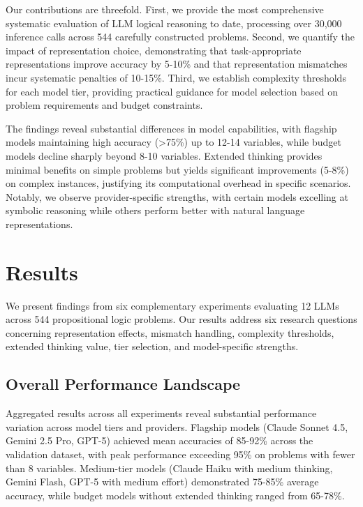 \documentclass[pdflatex,sn-mathphys-num]{sn-jnl}%
\theoremstyle{thmstyleone}%
\theoremstyle{thmstyletwo}%
\theoremstyle{thmstylethree}%
\begin{document}
Our contributions are threefold. First, we provide the most comprehensive systematic evaluation of LLM logical reasoning to date, processing over 30,000 inference calls across 544 carefully constructed problems. Second, we quantify the impact of representation choice, demonstrating that task-appropriate representations improve accuracy by 5-10\% and that representation mismatches incur systematic penalties of 10-15\%. Third, we establish complexity thresholds for each model tier, providing practical guidance for model selection based on problem requirements and budget constraints.

The findings reveal substantial differences in model capabilities, with flagship models maintaining high accuracy (>75\%) up to 12-14 variables, while budget models decline sharply beyond 8-10 variables. Extended thinking provides minimal benefits on simple problems but yields significant improvements (5-8\%) on complex instances, justifying its computational overhead in specific scenarios. Notably, we observe provider-specific strengths, with certain models excelling at symbolic reasoning while others perform better with natural language representations. 

\section{Results}\label{sec2}

We present findings from six complementary experiments evaluating 12 LLMs across 544 propositional logic problems. Our results address six research questions concerning representation effects, mismatch handling, complexity thresholds, extended thinking value, tier selection, and model-specific strengths.

\subsection{Overall Performance Landscape}\label{subsec:overall}

Aggregated results across all experiments reveal substantial performance variation across model tiers and providers. Flagship models (Claude Sonnet 4.5, Gemini 2.5 Pro, GPT-5) achieved mean accuracies of 85-92\% across the validation dataset, with peak performance exceeding 95\% on problems with fewer than 8 variables. Medium-tier models (Claude Haiku with medium thinking, Gemini Flash, GPT-5 with medium effort) demonstrated 75-85\% average accuracy, while budget models without extended thinking ranged from 65-78\%.
\end{document}
